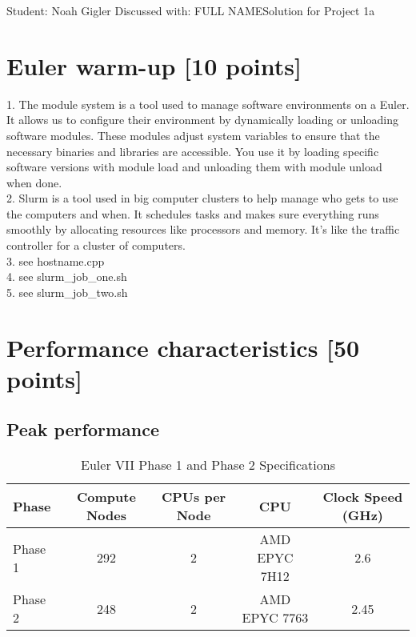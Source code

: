 \documentclass[unicode,11pt,a4paper,oneside,numbers=endperiod,openany]{scrartcl}
\begin{document}
\setassignment
{}

            {Student: Noah Gigler}
            {Discussed with: FULL NAME}{Solution for Project 1a}{}
\newline

\assignmentpolicy

\section{Euler warm-up [10 points]}

1. The module system is a tool used to manage software environments on a Euler. 
It allows us to configure their environment by dynamically loading or unloading software modules. 
These modules adjust system variables to ensure that the necessary binaries and libraries are accessible.
You use it by loading specific software versions with module load and unloading them with module unload when done.
\\
2. Slurm is a tool used in big computer clusters to help manage who gets to use the computers and when. 
It schedules tasks and makes sure everything runs smoothly by allocating resources like processors and memory.
It's like the traffic controller for a cluster of computers.
\\
3.
see hostname.cpp
\\
4.
see slurm\_job\_one.sh
\\
5.
see slurm\_job\_two.sh

\section{Performance characteristics [50 points]}

\subsection{Peak performance}

\begin{table}[ht]
\centering
\caption{Euler VII Phase 1 and Phase 2 Specifications}
\begin{tabular}{|l|c|c|c|c|}
\hline
\textbf{Phase} & \textbf{Compute Nodes} & \textbf{CPUs per Node} & \textbf{CPU} & \textbf{Clock Speed (GHz)} \\ \hline
Phase 1        & 292                    & 2                      & AMD EPYC 7H12 & 2.6                        \\ \hline
Phase 2        & 248                    & 2                      & AMD EPYC 7763 & 2.45                       \\ \hline
\end{tabular}
\end{table}
\end{document}
